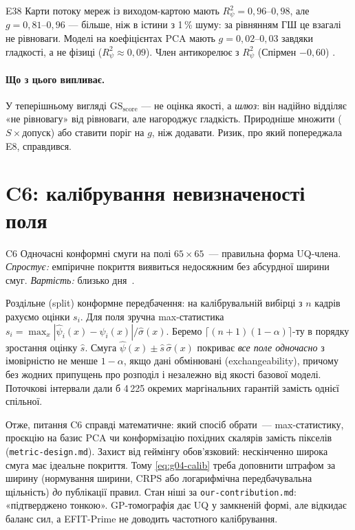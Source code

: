 \begin{established}{E38}
Карти потоку мереж із виходом-картою мають $R^2_\psi=0{,}96\text{--}0{,}98$, але $g=0{,}81\text{--}0{,}96$ ---
більше, ніж в істини з 1\,\% шуму: за рівнянням ГШ це взагалі не рівноваги. Моделі на коефіцієнтах
PCA мають $g=0{,}02\text{--}0{,}03$ завдяки гладкості, а не фізиці ($R^2_\psi\approx0{,}09$). Член
антикорелює з $R^2_\psi$ (Спірмен $-0{,}60$) \cite{RegEst}.
\end{established}

\paragraph{Що з цього випливає.} У теперішньому вигляді $\mathrm{GS}_{\mathrm{score}}$ --- не оцінка якості,
а \emph{шлюз}: він надійно відділяє «не рівновагу» від рівноваги, але нагороджує гладкість. Природніше
множити ($S\times$допуск) або ставити поріг на $g$, ніж додавати. Ризик, про який попереджала E8,
справдився.

\section{C6: калібрування невизначеності поля}\label{sec:g04-c6}

\begin{conjecture}{C6}
Одночасні конформні смуги на полі $65\times65$~--- правильна форма UQ-члена. \emph{Спростує:} емпіричне покриття виявиться недосяжним без абсурдної ширини смуг. \emph{Вартість:} близько дня~\cite{RegConj}.
\end{conjecture}

\begin{outofcorpus}
Роздільне (split) конформне передбачення: на калібрувальній вибірці з $n$ кадрів рахуємо оцінки $s_i$. Для поля зручна max-статистика $s_i=\max_{x}|\hat\psi_i(x)-\psi_i(x)|/\hat\sigma(x)$. Беремо $\lceil(n+1)(1-\alpha)\rceil$-ту в порядку зростання оцінку $\hat s$. Смуга $\hat\psi(x)\pm\hat s\,\hat\sigma(x)$ покриває \emph{все поле одночасно} з імовірністю не менше $1-\alpha$, якщо дані обмінювані (exchangeability), причому без жодних припущень про розподіл і незалежно від якості базової моделі. Поточкові інтервали дали б 4\,225 окремих маргінальних гарантій замість однієї спільної.
\end{outofcorpus}

Отже, питання C6 справді математичне: який спосіб обрати~--- max-статистику, проєкцію на базис PCA чи конформізацію похідних скалярів замість пікселів (\texttt{metric-design.md}). Захист від геймінгу обов'язковий: нескінченно широка смуга має ідеальне покриття. Тому \eqref{eq:g04-calib} треба доповнити штрафом за ширину (нормування ширини, CRPS або логарифмічна передбачувальна щільність) \emph{до} публікації правил. Стан ніші за \texttt{our-contribution.md}: «підтверджено тонкою». GP-томографія дає UQ у замкненій формі, але відкидає баланс сил, а EFIT-Prime не доводить частотного калібрування.

